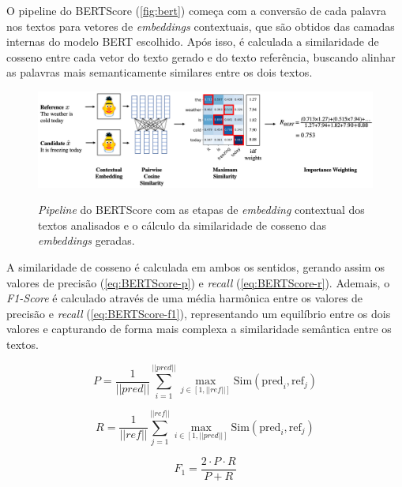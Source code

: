 \documentclass[cic,tc]{iiufrgs}
\begin{document}
O pipeline do BERTScore (\autoref{fig:bert}) começa com a conversão de cada palavra nos textos para vetores de \textit{embeddings} contextuais, que são obtidos das camadas internas do modelo BERT escolhido. Após isso, é calculada a similaridade de cosseno entre cada vetor do texto gerado e do texto referência, buscando alinhar as palavras mais semanticamente similares entre os dois textos. 

\begin{figure}[htbp]
    \centering
    \caption{\textit{Pipeline} do BERTScore com as etapas de \textit{embedding} contextual dos textos analisados e o cálculo da similaridade de cosseno das \textit{embeddings} geradas.}
    \vspace{4mm}
    \includegraphics[width=\textwidth]{Figures/bert_score.png}
    \label{fig:bert}
\end{figure}

A similaridade de cosseno é calculada em ambos os sentidos, gerando assim os valores de precisão (\autoref{eq:BERTScore-p}) e \textit{recall} (\autoref{eq:BERTScore-r}). Ademais, o \textit{F1-Score} é calculado através de uma média harmônica entre os valores de precisão e \textit{recall} (\autoref{eq:BERTScore-f1}), representando um equilíbrio entre os dois valores e capturando de forma mais complexa a similaridade semântica entre os textos.

\begin{equation}
    \label{eq:BERTScore-p}
    P = \frac{1}{||pred||} \sum_{i=1}^{||pred||} \max_{j \in [1, ||ref||]} \text{Sim}(\text{pred}_i, \text{ref}_j)
\end{equation}

\begin{equation}
    \label{eq:BERTScore-r}
    R = \frac{1}{||ref||} \sum_{j=1}^{||ref||} \max_{i \in [1, ||pred||]} \text{Sim}(\text{pred}_i, \text{ref}_j)
\end{equation}

\begin{equation}
    \label{eq:BERTScore-f1}
    F_1 = \frac{2 \cdot P \cdot R}{P + R}
\end{equation}
\end{document}
